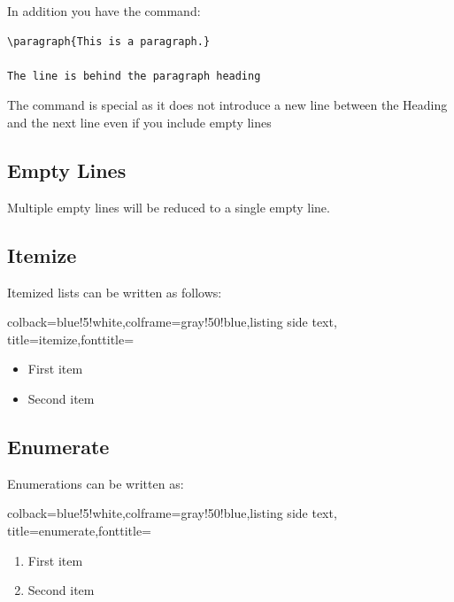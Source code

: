In addition you have the command:

\begin{verbatim}
\paragraph{This is a paragraph.}

The line is behind the paragraph heading
\end{verbatim}

The command is special as it does not introduce a new line between the
Heading and the next line even if you include empty lines

\subsection{Empty Lines}\label{empty-lines}

Multiple empty lines will be reduced to a single empty line.

\subsection{Itemize}\label{itemize}


Itemized lists can be written as follows:


\begin{tcblisting}{colback=blue!5!white,colframe=gray!50!blue,listing side text,
  title=itemize,fonttitle=\bfseries}
\begin{itemize}
   \item First item
   \item Second item
\end{itemize}
\end{tcblisting} 


\subsection{Enumerate}\label{enumerate}

Enumerations can be written as:

\begin{tcblisting}{colback=blue!5!white,colframe=gray!50!blue,listing side text,
  title=enumerate,fonttitle=\bfseries}
\begin{enumerate}
   \item First item
   \item Second item
\end{enumerate}
\end{tcblisting} 

